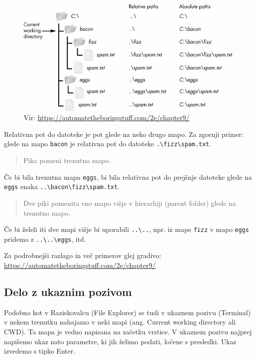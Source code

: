 \documentclass[
]{book}
\begin{document}
\begin{figure}
\centering
\includegraphics{./images/paths.jpeg}
\caption{Vir: \url{https://automatetheboringstuff.com/2e/chapter9/}}
\end{figure}

Relativna pot do datoteke je pot glede na neko drugo mapo. Za zgornji primer:
glede na mapo \texttt{bacon} je relativna pot do datoteke \texttt{.\textbackslash{}fizz\textbackslash{}spam.txt}.

\begin{quote}
Pika pomeni trenutno mapo.
\end{quote}

Če bi bila trenutna mapa \texttt{eggs}, bi bila relativna pot do prejšnje datoteke
glede na \texttt{eggs} enaka \texttt{..\textbackslash{}bacon\textbackslash{}fizz\textbackslash{}spam.txt}.

\begin{quote}
Dve piki pomenita eno mapo višje v hierarhiji (parent folder) glede na trenutno mapo.
\end{quote}

Če bi želeli iti dve mapi višje bi uporabili \texttt{..\textbackslash{}..}, npr. iz mape
\texttt{fizz} v mapo \texttt{eggs} pridemo z \texttt{..\textbackslash{}..\textbackslash{}eggs}, itd.

Za podrobnejši razlago in več primerov glej gradivo: \url{https://automatetheboringstuff.com/2e/chapter9/}

\hypertarget{delo-z-ukaznim-pozivom}{%
\subsection{Delo z ukaznim pozivom}\label{delo-z-ukaznim-pozivom}}

Podobno kot v Raziskovalcu (File Explorer) se tudi v ukaznem pozivu (Terminal) v
nekem trenutku nahajamo v neki mapi (ang. Current working directory ali CWD).
Ta mapa je vedno napisana na začetku vrstice.
V ukaznem pozivu najprej napišemo ukaz nato parametre, ki jih želimo podati, ločene
s presledki. Ukaz izvedemo s tipko Enter.
\end{document}
